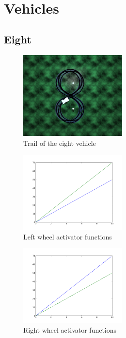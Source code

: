 \documentclass[a4paper]{article}
\begin{document}
\cleardoublepage
\section{Vehicles}
\subsection{Eight}
\begin{figure}
	\begin{center}
		\includegraphics[width=0.48\textwidth]{trail/eight.png}
	\end{center}
	\caption{Trail of the eight vehicle}
\end{figure}

\begin{figure}
	\begin{center}
		\includegraphics[width=0.48\textwidth]{graphs/activators/eight_l.png}
	\end{center}
	\caption{Left wheel activator functions}
\end{figure}

\begin{figure}
	\begin{center}
		\includegraphics[width=0.48\textwidth]{graphs/activators/eight_r.png}
	\end{center}
	\caption{Right wheel activator functions}
\end{figure}
\end{document}
